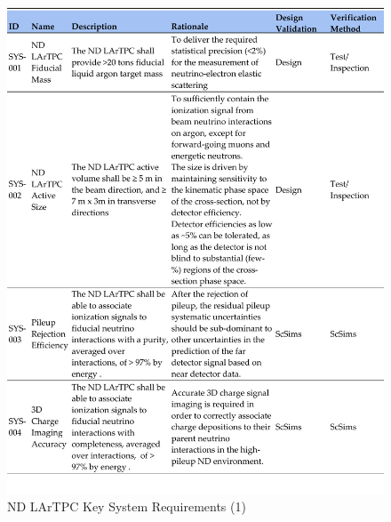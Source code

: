 \begin{figure}
\centering 
\includegraphics[width=1\linewidth]{graphics/lartpc/0Req/NDreqs1.pdf}
\caption{\label{fig:lartpcreq1} ND LArTPC Key System Requirements (1)}
\end{figure}
